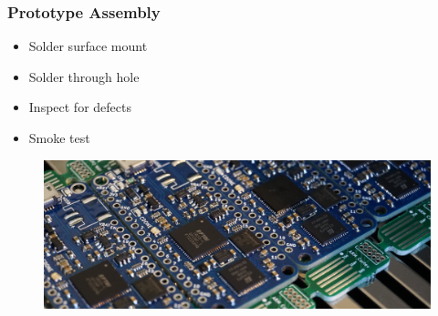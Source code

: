\documentclass[aspectratio=169, t]{beamer}
\begin{document}
\begin{frame}
\frametitle{Prototype Assembly}
	\begin{itemize}
		\item Solder surface mount
		\item Solder through hole
		\item Inspect for defects
		\item Smoke test
	\end{itemize}	

\begin{figure}
	\includegraphics[width=0.8\linewidth]{images/ice40-reflow.jpeg}
\end{figure}
\end{frame}
\end{document}
